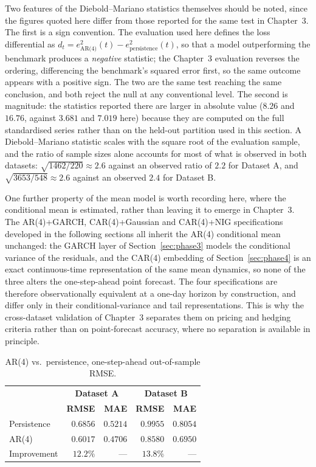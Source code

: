 \documentclass[11pt, a4paper, twoside]{article}
\begin{document}
Two features of the Diebold--Mariano statistics themselves should be noted, since the figures quoted here differ from those reported for the same test in Chapter~3. The first is a sign convention. The evaluation used here defines the loss differential as $d_t = e^2_{\text{AR(4)}}(t) - e^2_{\text{persistence}}(t)$, so that a model outperforming the benchmark produces a \emph{negative} statistic; the Chapter~3 evaluation reverses the ordering, differencing the benchmark's squared error first, so the same outcome appears with a positive sign. The two are the same test reaching the same conclusion, and both reject the null at any conventional level. The second is magnitude: the statistics reported there are larger in absolute value ($8.26$ and $16.76$, against $3.681$ and $7.019$ here) because they are computed on the full standardised series rather than on the held-out partition used in this section. A Diebold--Mariano statistic scales with the square root of the evaluation sample, and the ratio of sample sizes alone accounts for most of what is observed in both datasets: $\sqrt{1462/220} \approx 2.6$ against an observed ratio of $2.2$ for Dataset A, and $\sqrt{3653/548} \approx 2.6$ against an observed $2.4$ for Dataset B.

One further property of the mean model is worth recording here, where the conditional mean is estimated, rather than leaving it to emerge in Chapter~3. The AR(4)+GARCH, CAR(4)+Gaussian and CAR(4)+NIG specifications developed in the following sections all inherit the AR(4) conditional mean unchanged: the GARCH layer of Section~\ref{sec:phase3} models the conditional variance of the residuals, and the CAR(4) embedding of Section~\ref{sec:phase4} is an exact continuous-time representation of the same mean dynamics, so none of the three alters the one-step-ahead point forecast. The four specifications are therefore observationally equivalent at a one-day horizon by construction, and differ only in their conditional-variance and tail representations. This is why the cross-dataset validation of Chapter~3 separates them on pricing and hedging criteria rather than on point-forecast accuracy, where no separation is available in principle.

\begin{table}[htbp]
\centering
\caption{AR(4) vs.\ persistence, one-step-ahead out-of-sample RMSE.}
\label{tab:ar4-rmse}
\begin{tabular}{l r r r r}
\toprule
& \multicolumn{2}{c}{\textbf{Dataset A}} & \multicolumn{2}{c}{\textbf{Dataset B}} \\
& \textbf{RMSE} & \textbf{MAE} & \textbf{RMSE} & \textbf{MAE} \\
\midrule
Persistence & $0.6856$ & $0.5214$ & $0.9955$ & $0.8054$ \\
AR(4) & $0.6017$ & $0.4706$ & $0.8580$ & $0.6950$ \\
Improvement & $12.2\%$ & --- & $13.8\%$ & --- \\
\bottomrule
\end{tabular}
\end{table}
\end{document}
